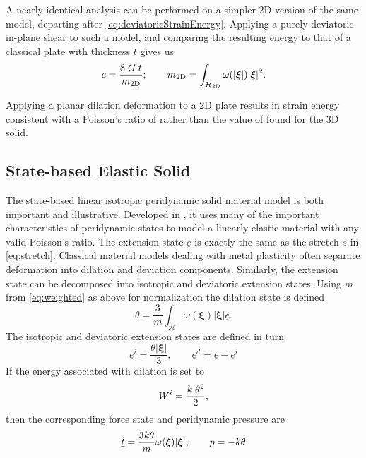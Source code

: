 A nearly identical analysis can be performed on a simpler 2D version of the same model, departing after \cref{eq:deviatoricStrainEnergy}.
Applying a purely deviatoric in-plane shear to such a model, and comparing the resulting energy to that of a classical plate with thickness $t$ gives us
%
\begin{equation}
c = \frac{8\;G\;t}{m_\textrm{2D}};\qquad m_\textrm{2D} =\int_\mathcal{H_\textrm{2D}}\omega(|\boldsymbol{\xi}|)|\boldsymbol{\xi}|^2.  \notag
\end{equation}
%

Applying a planar dilation deformation to a 2D plate results in strain energy consistent with a Poisson's ratio of  rather than the value of  found for the 3D solid.

\subsection{State-based Elastic Solid}
The state-based linear isotropic peridynamic solid material model is both important and illustrative.
Developed in \cite{silling2007peridynamic}, it uses many of the important characteristics of peridynamic states to model a linearly-elastic material with any valid Poisson's ratio.
The extension state $\underline{e}$ is exactly the same as the stretch $s$ in \cref{eq:stretch}.
Classical material models dealing with metal plasticity often separate deformation into dilation and deviation components.
Similarly, the extension state can be decomposed into isotropic and deviatoric extension states. Using $m$ from \cref{eq:weighted} as above for normalization the dilation state is defined
%
\begin{equation}
\theta = \frac{3}{m} \int_\mathcal{H} \omega(\boldsymbol{\xi}) |\boldsymbol{\xi}| \underline{e}.
\end{equation}
%
The isotropic and deviatoric extension states are defined in turn
%
\begin{equation}
\underline{e}^i = \frac{\theta |\boldsymbol{\xi}|}{3},\qquad \underline{e}^d = \underline{e}-\underline{e}^i
\end{equation}
%
If the energy associated with dilation is set to
%
\begin{equation}
W^i = \frac{k\;\theta^2}{2},\notag
\end{equation}
%
then the corresponding force state and peridynamic pressure are
%
\begin{equation}
\underline{t} = \frac{3k\theta}{m}\omega(\boldsymbol{\xi})|\boldsymbol{\xi}|,\qquad p=-k\theta\notag
\end{equation}
